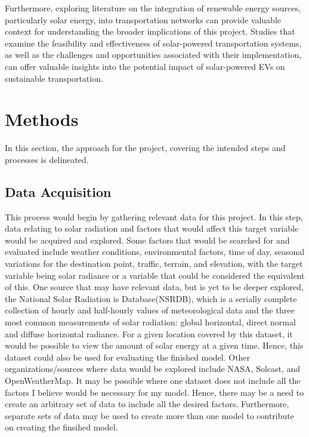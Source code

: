 \documentclass[10pt,twocolumn]{article}
\begin{document}
Furthermore, exploring literature on the integration of renewable energy sources, particularly solar energy, into transportation networks can provide valuable context for understanding the broader implications of this project. Studies that examine the feasibility and effectiveness of solar-powered transportation systems, as well as the challenges and opportunities associated with their implementation, can offer valuable insights into the potential impact of solar-powered EVs on sustainable transportation.




\section{Methods}
In this section, the approach for the project, covering the intended steps and processes is delineated.

\subsection{Data Acquisition} 
 This process would begin by gathering relevant data for this project. In this step, data relating to solar radiation and factors that would affect this target variable would be acquired and explored. Some factors that would be searched for and evaluated include weather conditions, environmental factors, time of day, seasonal variations for the destination point, traffic, terrain, and elevation, with the target variable being solar radiance or a variable that could be considered the equivalent of this.  One source that may have relevant data, but is yet to be deeper explored, the National Solar Radiation is Database(NSRDB), which is a serially complete collection of hourly and half-hourly values of meteorological data and the three most common measurements of solar radiation: global horizontal, direct normal and diffuse horizontal radiance. For a given location covered by this dataset, it would be possible to view the amount of solar energy at a given time. Hence, this dataset could also be used for evaluating the finished model. Other organizations/sources where data would be explored include NASA, Solcast, and OpenWeatherMap. It may be possible where one dataset does not include all the factors I believe would be necessary for my model. Hence, there may be a need to create an arbitrary set of data to include all the desired factors. Furthermore, separate sets of data may be used to create more than one model to contribute on creating the finsihed model. 
 
\end{document}

